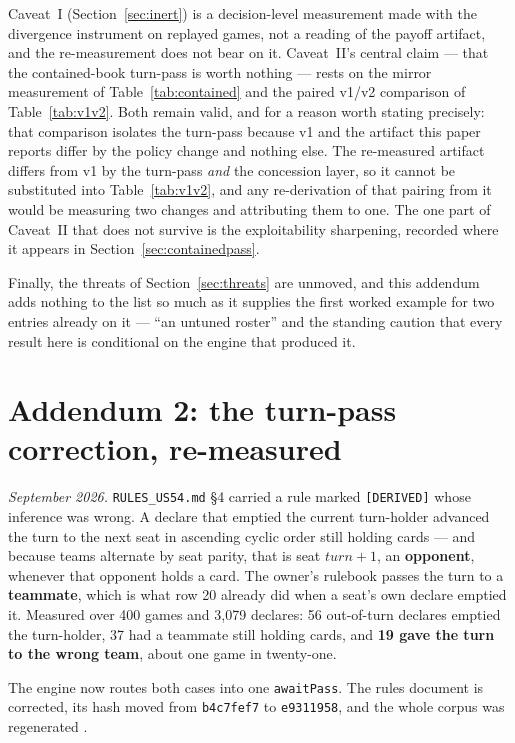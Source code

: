 \documentclass[11pt]{article}
\newcommand{\code}[1]{\texttt{#1}}
\begin{document}
Caveat~I (Section~\ref{sec:inert}) is a decision-level measurement made with the divergence
instrument on replayed games, not a reading of the payoff artifact, and the re-measurement does
not bear on it. Caveat~II's central claim --- that the contained-book turn-pass is worth
nothing --- rests on the mirror measurement of Table~\ref{tab:contained} and the paired v1/v2
comparison of Table~\ref{tab:v1v2}. Both remain valid, and for a reason worth stating precisely:
that comparison isolates the turn-pass because v1 and the artifact this paper reports differ by
the policy change and nothing else. The re-measured artifact differs from v1 by the turn-pass
\emph{and} the concession layer, so it cannot be substituted into Table~\ref{tab:v1v2}, and any
re-derivation of that pairing from it would be measuring two changes and attributing them to
one. The one part of Caveat~II that does not survive is the exploitability sharpening, recorded
where it appears in Section~\ref{sec:containedpass}.

Finally, the threats of Section~\ref{sec:threats} are unmoved, and this addendum adds nothing to
the list so much as it supplies the first worked example for two entries already on it ---
``an untuned roster'' and the standing caution that every result here is conditional on the
engine that produced it.

\section{Addendum 2: the turn-pass correction, re-measured}
\label{sec:addturnpass}

\emph{September 2026.} \code{RULES\_US54.md} \S4 carried a rule marked \code{[DERIVED]} whose
inference was wrong. A declare that emptied the current turn-holder advanced the turn to the next
seat in ascending cyclic order still holding cards --- and because teams alternate by seat parity,
that is seat $\mathit{turn}+1$, an \textbf{opponent}, whenever that opponent holds a card. The
owner's rulebook passes the turn to a \textbf{teammate}, which is what row 20 already did when a
seat's own declare emptied it. Measured over 400 games and 3{,}079 declares: 56 out-of-turn
declares emptied the turn-holder, 37 had a teammate still holding cards, and \textbf{19 gave the
turn to the wrong team}, about one game in twenty-one.

The engine now routes both cases into one \code{awaitPass}. The rules document is corrected, its
hash moved from \code{b4c7fef7} to \code{e9311958}, and the whole corpus was regenerated
\cite{rules}.
\end{document}
